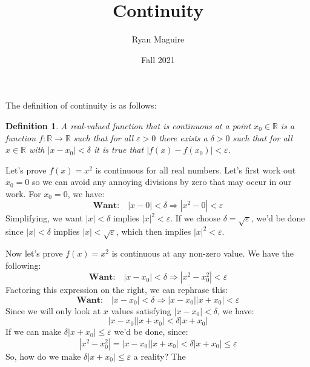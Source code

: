 \documentclass{article}
\title{Continuity}
\author{Ryan Maguire}
\date{Fall 2021}
\theoremstyle{normal}
\newtheorem{definition}{Definition}
\begin{document}
    \maketitle
    The definition of continuity is as follows:
    \begin{definition}
        A real-valued function that is continuous at a point
        $x_{0}\in\mathbb{R}$ is a function $f:\mathbb{R}\rightarrow\mathbb{R}$
        such that for all $\varepsilon>0$ there exists a $\delta>0$ such that
        for all $x\in\mathbb{R}$ with $|x-x_{0}|<\delta$ it is true that
        $|f(x)-f(x_{0})|<\varepsilon$.
    \end{definition}
    Let's prove $f(x)=x^{2}$ is continuous for all real numbers. Let's first
    work out $x_{0}=0$ so we can avoid any annoying divisions by zero that may
    occur in our work. For $x_{0}=0$, we have:
    \begin{equation}
        \textbf{Want:}\quad
        |x-0|<\delta
        \Rightarrow|x^{2}-0|<\varepsilon
    \end{equation}
    Simplifying, we want $|x|<\delta$ implies $|x|^{2}<\varepsilon$. If we
    choose $\delta=\sqrt{\varepsilon}$, we'd be done since
    $|x|<\delta$ implies $|x|<\sqrt{\varepsilon}$, which then implies
    $|x|^{2}<\varepsilon$.
    \par\hfill\par
    Now let's prove $f(x)=x^{2}$ is continuous at any non-zero value. We have
    the following:
    \begin{equation}
        \textbf{Want:}\quad
        |x-x_{0}|<\delta
        \Rightarrow|x^{2}-x_{0}^{2}|<\varepsilon
    \end{equation}
    Factoring this expression on the right, we can rephrase this:
    \begin{equation}
        \textbf{Want:}\quad
        |x-x_{0}|<\delta
        \Rightarrow
        |x-x_{0}||x+x_{0}|<\varepsilon
    \end{equation}
    Since we will only look at $x$ values satisfying $|x-x_{0}|<\delta$,
    we have:
    \begin{equation}
        |x-x_{0}||x+x_{0}|<\delta|x+x_{0}|
    \end{equation}
    If we can make $\delta|x+x_{0}|\leq\varepsilon$ we'd be done, since:
    \begin{equation}
        |x^{2}-x_{0}^{2}|=|x-x_{0}||x+x_{0}|
        <\delta|x+x_{0}|\leq\varepsilon
    \end{equation}
    So, how do we make $\delta|x+x_{0}|\leq\varepsilon$ a reality? The
\end{document}
